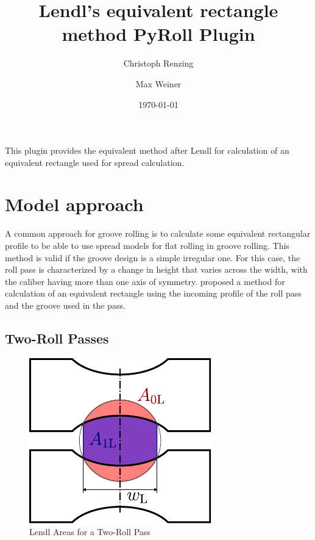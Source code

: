 \documentclass{PyRollDocs}
\begin{document}
    \title{Lendl's equivalent rectangle method PyRoll Plugin}
    \author{Christoph Renzing \and Max Weiner}
    \date{\today}

    \maketitle

    This plugin provides the equivalent method after Lendl for calculation of an equivalent rectangle used for spread calculation.


    \section{Model approach}\label{sec:model-approach}

    A common approach for groove rolling is to calculate some equivalent rectangular profile to be able to use spread models for flat rolling in groove rolling.
    This method is valid if the groove design is a simple irregular one.
    For this case, the roll pass is characterized by a change in height that varies across the width, with the caliber having more than one axis of symmetry.
    \textcite{Lendl_1948a, Lendl_1948b, Lendl_1949} proposed a method for calculation of an equivalent rectangle using the incoming profile of the roll pass and the groove used in the pass.

    \subsection{Two-Roll Passes}

    \begin{figure}[ht]
        \centering
        \includegraphics{lendl-2-roll}
        \caption{Lendl Areas for a Two-Roll Pass}
        \label{fig:lendl-2-roll}
    \end{figure}
\end{document}
